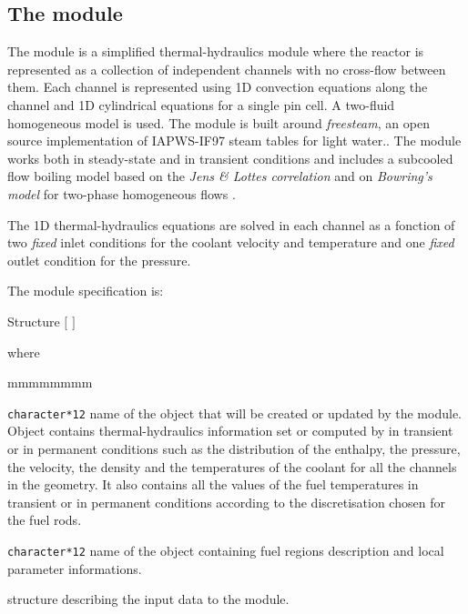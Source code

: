 \subsection{The  module}\label{sect:thm}

\vskip 0.2cm
The  module is a simplified thermal-hydraulics module where the
reactor is represented as a collection of independent channels with no
cross-flow between them. Each channel is represented using 1D convection
equations along the channel and 1D cylindrical equations for a single pin cell.
A two-fluid homogeneous model is used. The  module is built around {\sl freesteam},
an open source implementation of IAPWS-IF97 steam tables for light water.\cite{freesteam}.
The  module works both in steady-state and in transient conditions and includes
a subcooled flow boiling model based on the {\sl Jens \& Lottes correlation} \cite{jenslottes} and on {\sl Bowring's model} for two-phase homogeneous flows \cite{bowring}.

\vskip 0.08cm

The 1D thermal-hydraulics equations are solved in each channel as a fonction of two
{\sl fixed} inlet conditions for the coolant velocity and temperature and one {\sl fixed} outlet condition for the pressure.

\vskip 0.1cm

\noindent
The  module specification is:

\begin{DataStructure}{Structure }
  \moc{:=} 
$[$  $]$  \moc{::} 
\end{DataStructure}

\noindent where

\begin{ListeDeDescription}{mmmmmmmm}

\item[\dusa{THERMO}] \texttt{character*12} name of the 
object that will be created or updated by the  module. Object 
contains thermal-hydraulics information set or computed by  in transient or in
permanent conditions such as the distribution of the enthalpy, the pressure, the velocity,
the density and the temperatures of the coolant for all the channels in the geometry. It also contains all the values of the fuel temperatures in transient or in permanent conditions according to the discretisation chosen for the fuel rods.

\item[\dusa{MAPFL}] \texttt{character*12} name of the  
object containing fuel regions description and local parameter informations.

\item[\dstr{descthm}] structure describing the input data to the  module. 

\end{ListeDeDescription}

